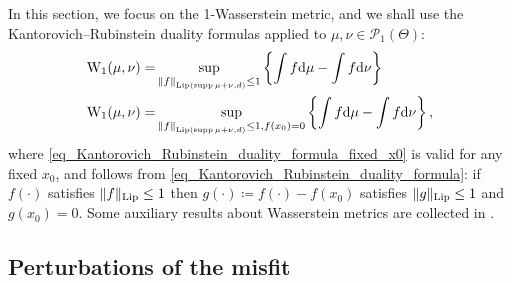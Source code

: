 \documentclass[a4paper]{scrartcl}
\theoremstyle{definition}
\numberwithin{equation}{section}
\newcommand{\rd}{\mathrm{d}}
\DeclareMathOperator{\supp}{supp}
\newcommand{\norm}[1]{\Vert #1 \Vert}
\newcommand{\Norm}[1]{\left\Vert #1 \right\Vert}
\newcommand{\Lip}[0]{\textup{Lip}}
\newcommand{\Was}[0]{\textup{W}}
\begin{document}
In this section, we focus on the 1-Wasserstein metric, and we shall use the Kantorovich--Rubinstein duality formulas applied to $\mu,\nu\in\mathcal{P}_1(\Theta)$:
\begin{subequations}
 \begin{align}
 \label{eq_Kantorovich_Rubinstein_duality_formula}
\Was_1(\mu,\nu)=&\sup_{\Norm{f}_{\Lip(\supp{\mu+\nu},d)}\leq 1}\left\{\int f \rd \mu-\int f \rd \nu\right\}
\\
 \label{eq_Kantorovich_Rubinstein_duality_formula_fixed_x0}
\Was_1(\mu,\nu)=&\sup_{\Norm{f}_{\Lip(\supp{\mu+\nu},d)}\leq 1, f(x_0)=0}\left\{\int f \rd \mu-\int f \rd \nu\right\},
\end{align}
\end{subequations}
where \eqref{eq_Kantorovich_Rubinstein_duality_formula_fixed_x0} is valid for any fixed $x_0$, and follows from \eqref{eq_Kantorovich_Rubinstein_duality_formula}: if $f(\cdot)$ satisfies $\norm{f}_{\Lip}\leq 1$ then $g(\cdot)\coloneqq f(\cdot)-f(x_0)$ satisfies $\norm{g}_{\Lip}\leq 1$ and $g(x_0)=0$.
Some auxiliary results about Wasserstein metrics are collected in .

\subsection{Perturbations of the misfit}
\label{sectionW1bounds_misfit_perturbations}
\end{document}
